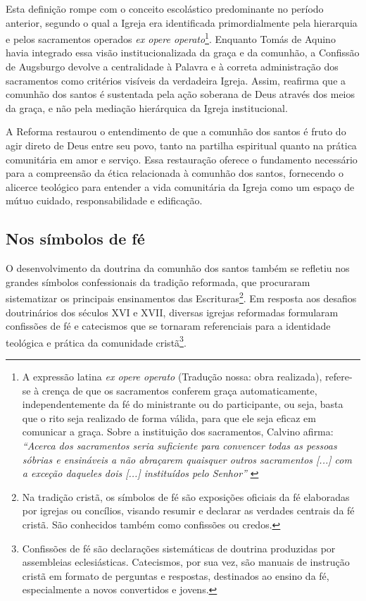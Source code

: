 Esta definição rompe com o conceito escolástico predominante no período anterior, segundo o qual a Igreja era identificada primordialmente pela hierarquia e pelos sacramentos operados \textit{\foreignlanguage{latin}{ex opere operato}}\footnote{A expressão latina \textit{\foreignlanguage{latin}{ex opere operato}} (Tradução nossa: obra realizada), refere-se à crença de que os sacramentos conferem graça automaticamente, independentemente da fé do ministrante ou do participante, ou seja, basta que o rito seja realizado de forma válida, para que ele seja eficaz em comunicar a graça. Sobre a instituição dos sacramentos, Calvino afirma: \textit{``Acerca dos sacramentos seria suficiente para convencer todas as pessoas sóbrias e ensináveis a não abraçarem quaisquer outros sacramentos [...] com a exceção daqueles dois [...] instituídos pelo Senhor''} \cite[v.~4, Capítulo~XIX, p.~2605]{calvino2022}}. Enquanto Tomás de Aquino havia integrado essa visão institucionalizada da graça e da comunhão, a Confissão de Augsburgo devolve a centralidade à Palavra e à correta administração dos sacramentos como critérios visíveis da verdadeira Igreja. Assim, reafirma que a comunhão dos santos é sustentada pela ação soberana de Deus através dos meios da graça, e não pela mediação hierárquica da Igreja institucional.

A Reforma restaurou o entendimento de que a comunhão dos santos é fruto do agir direto de Deus entre seu povo, tanto na partilha espiritual quanto na prática comunitária em amor e serviço. Essa restauração oferece o fundamento necessário para a compreensão da ética relacionada à comunhão dos santos, fornecendo o alicerce teológico para entender a vida comunitária da Igreja como um espaço de mútuo cuidado, responsabilidade e edificação.

\subsection{Nos símbolos de fé}

O desenvolvimento da doutrina da comunhão dos santos também se refletiu nos grandes símbolos confessionais da tradição reformada, que procuraram sistematizar os principais ensinamentos das Escrituras\footnote{Na tradição cristã, os símbolos de fé são exposições oficiais da fé elaboradas por igrejas ou concílios, visando resumir e declarar as verdades centrais da fé cristã. São conhecidos também como confissões ou credos.}. Em resposta aos desafios doutrinários dos séculos XVI e XVII, diversas igrejas reformadas formularam confissões de fé e catecismos que se tornaram referenciais para a identidade teológica e prática da comunidade cristã\footnote{Confissões de fé são declarações sistemáticas de doutrina produzidas por assembleias eclesiásticas. Catecismos, por sua vez, são manuais de instrução cristã em formato de perguntas e respostas, destinados ao ensino da fé, especialmente a novos convertidos e jovens.}.

